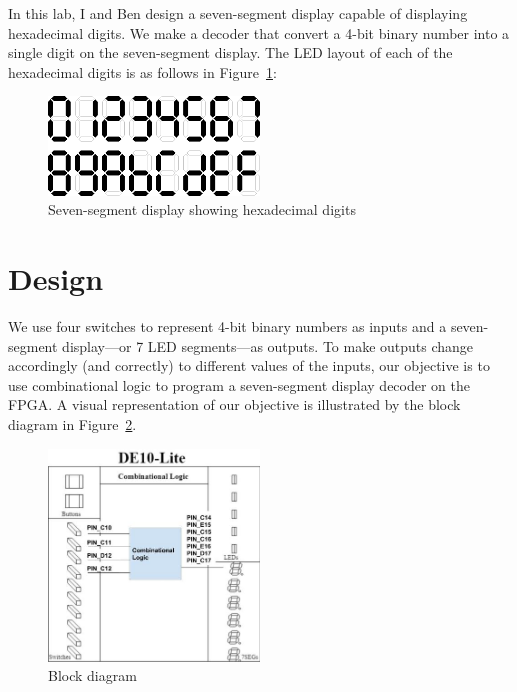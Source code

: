 \documentclass[12pt]{article}
\begin{document}
In this lab, I and Ben design a seven-segment display capable of displaying hexadecimal digits. We make a decoder that convert a 4-bit binary number into a single digit on the seven-segment display. The LED layout of each of the hexadecimal digits is as follows in Figure~\ref{figure:2}:

\begin{figure}[h]
  \centering
  \includegraphics[width=0.5\textwidth]{seven_segment_hexadecimal.png}
  \caption{Seven-segment display showing hexadecimal digits \cite{EEStackExchangeSevenSegmentHex}}
  \label{figure:2}
\end{figure}

\newpage

\section{Design}

We use four switches to represent 4-bit binary numbers as inputs and a seven-segment display---or 7 LED segments---as outputs. To make outputs change accordingly (and correctly) to different values of the inputs, our objective is to use combinational logic to program a seven-segment display decoder on the FPGA. A visual representation of our objective is illustrated by the block diagram in Figure~\ref{figure:3}.

\begin{figure}[h]
  \centering
  \includegraphics[width=0.5\textwidth]{lab3_block_diagram.png}
  \caption{Block diagram}
  \label{figure:3}
\end{figure}
\end{document}
